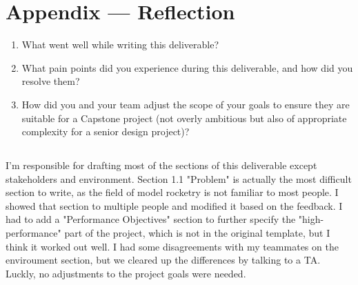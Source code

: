 \documentclass{article}
\begin{document}
\section*{Appendix --- Reflection}




\begin{enumerate}
  \item What went well while writing this deliverable?
  \item What pain points did you experience during this deliverable, and how did you
        resolve them?
  \item How did you and your team adjust the scope of your goals to ensure they are
        suitable for a Capstone project (not overly ambitious but also of appropriate
        complexity for a senior design project)?
\end{enumerate}

\subsection*{\color{blue}{Jianqing Liu}}

I'm responsible for drafting most of the sections of this deliverable except
stakeholders and environment. Section 1.1 "Problem" is actually the most
difficult section to write, as the field of model rocketry is not familiar to
most people. I showed that section to multiple people and modified it based on
the feedback. I had to add a "Performance Objectives" section to further
specify the "high-performance" part of the project, which is not in the
original template, but I think it worked out well. I had some disagreements
with my teammates on the enviroument section, but we cleared up the differences
by talking to a TA. Luckly, no adjustments to the project goals were needed.
\end{document}
